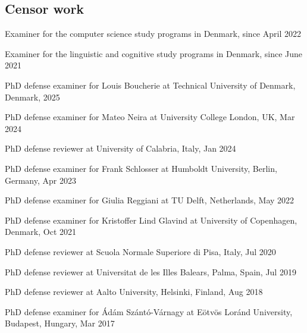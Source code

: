 \documentclass[10pt,a4paper]{article}
\renewenvironment{itemize}{
  \begin{list}{}{
    \setlength{\leftmargin}{1.5em}
    \setlength{\itemsep}{0.25em}
    \setlength{\parskip}{0pt}
    \setlength{\parsep}{0.25em}
  }
}{
  \end{list}
}
\begin{document}
\subsection*{Censor work}
\begin{itemize} 
\item{Examiner for the computer science study programs in Denmark, since April 2022}
\item{Examiner for the linguistic and cognitive study programs in Denmark, since June 2021}
\item{PhD defense examiner for Louis Boucherie at Technical University of Denmark, Denmark, 2025}
\item{PhD defense examiner for Mateo Neira at University College London, UK, Mar 2024}
\item{PhD defense reviewer at University of Calabria, Italy, Jan 2024}
\item{PhD defense examiner for Frank Schlosser at Humboldt University, Berlin, Germany, Apr 2023}
\item{PhD defense examiner for Giulia Reggiani at TU Delft, Netherlands, May 2022}
\item{PhD defense examiner for Kristoffer Lind Glavind at University of Copenhagen, Denmark, Oct 2021}
\item{PhD defense reviewer at Scuola Normale Superiore di Pisa, Italy, Jul 2020}
\item{PhD defense reviewer at Universitat de les Illes Balears, Palma, Spain, Jul 2019}
\item{PhD defense reviewer at Aalto University, Helsinki, Finland, Aug 2018}
\item{PhD defense examiner for Ádám Szántó-Várnagy at E{\"o}tv{\"o}s Lor{\'a}nd University, Budapest, Hungary, Mar 2017}
\end{itemize}
\end{document}
